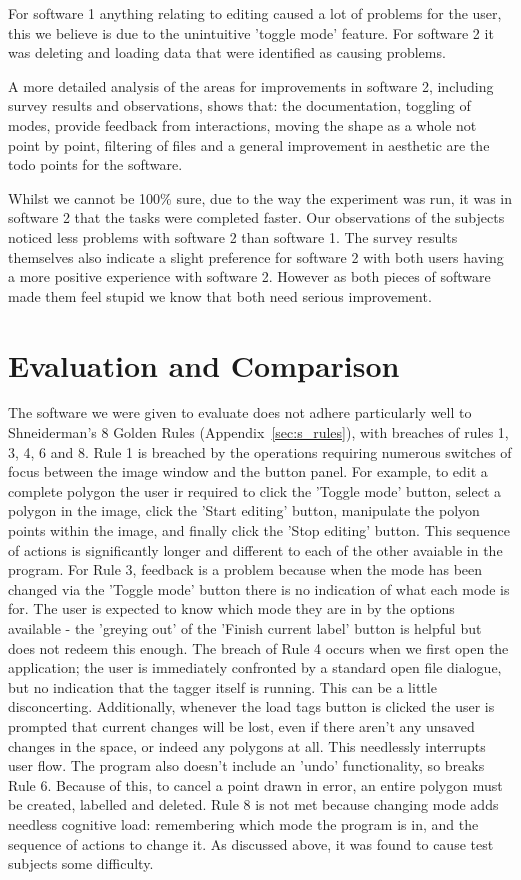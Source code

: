 \documentclass[a4paper,11pt,oneside]{article}
\begin{document}
For software 1 anything relating to editing caused a lot of problems for the user, this we believe is due to the unintuitive 'toggle mode' feature.  For software 2 it was deleting and loading data that were identified as causing problems.

A more detailed analysis of the areas for improvements in software 2, including survey results and observations, shows that: the documentation, toggling of modes, provide feedback from interactions, moving the shape as a whole not point by point, filtering of files and a general improvement in aesthetic are the todo points for the software.

Whilst we cannot be 100\% sure, due to the way the experiment was run, it was in software 2 that the tasks were completed faster.  Our observations of the subjects noticed less problems with software 2 than software 1.  The survey results themselves also indicate a slight preference for software 2 with both users having a more positive experience with software 2.  However as both pieces of software made them feel stupid we know that both need serious improvement.

\section{Evaluation and Comparison}

The software we were given to evaluate does not adhere particularly well to Shneiderman's 8 Golden Rules (Appendix~\ref{sec:s_rules}), with breaches of rules 1, 3, 4, 6 and 8. Rule 1 is breached by the operations requiring numerous switches of focus between the image window and the button panel. For example, to edit a complete polygon the user ir required to click the 'Toggle mode' button, select a polygon in the image, click the 'Start editing' button, manipulate the polyon points within the image, and finally click the 'Stop editing' button. This sequence of actions is significantly longer and different to each of the other avaiable in the program. For Rule 3, feedback is a problem because when the mode has been changed via the 'Toggle mode' button there is no indication of what each mode is for. The user is expected to know which mode they are in by the options available - the 'greying out' of the 'Finish current label' button is helpful but does not redeem this enough. The breach of Rule 4 occurs when we first open the application; the user is immediately confronted by a standard open file dialogue, but no indication that the tagger itself is running. This can be a little disconcerting. Additionally, whenever the load tags button is clicked the user is prompted that current changes will be lost, even if there aren't any unsaved changes in the space, or indeed any polygons at all. This needlessly interrupts user flow. The program also doesn't include an 'undo' functionality, so breaks Rule 6. Because of this, to cancel a point drawn in error, an entire polygon must be created, labelled and deleted. Rule 8 is not met because changing mode adds needless cognitive load: remembering which mode the program is in, and the sequence of actions to change it. As discussed above, it was found to cause test subjects some difficulty.
\end{document}
